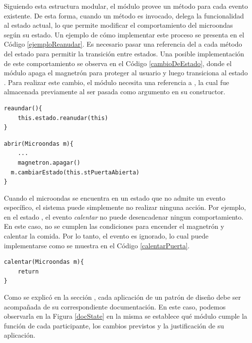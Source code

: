 Siguiendo esta estructura modular, el módulo \Microondas provee un método para cada evento existente. De esta forma, cuando un método es invocado, delega la funcionalidad al estado actual, lo que permite modificar el comportamiento del microondas según su estado. Un ejemplo de cómo implementar este proceso se presenta en el Código \ref{ejemploReanudar}. Es necesario pasar una referencia del \Microondas a cada método del estado para permitir la transición entre estados. Una posible implementación de este comportamiento se observa en el Código \ref{cambioDeEstado}, donde el módulo \Calentando apaga el magnetrón para proteger al usuario y luego transiciona al estado \PuertaAbierta. Para realizar este cambio, el módulo \Calentando necesita una referencia a \PuertaAbierta, la cual fue almacenada previamente al ser pasada como argumento en su constructor.

\begin{lstlisting}[caption=Ejemplo de implementación método reaundar del módulo Microondas, label=ejemploReanudar]
reaundar(){
    this.estado.reanudar(this)
}
\end{lstlisting}
\begin{lstlisting}[caption=Ejemplo de implementación método abrir del módulo Calentando, label=cambioDeEstado]
abrir(Microondas m){
	...
	magnetron.apagar()
  m.cambiarEstado(this.stPuertaAbierta)
}
\end{lstlisting}

Cuando el microondas se encuentra en un estado que no admite un evento específico, el sistema puede simplemente no realizar ninguna acción. Por ejemplo, en el estado \PuertaAbierta, el evento \textit{calentar} no puede desencadenar ningun comportamiento. En este caso, no se cumplen las condiciones para encender el magnetrón y calentar la comida. Por lo tanto, el evento es ignorado, lo cual puede implementarse como se muestra en el Código \ref{calentarPuerta}.
\begin{lstlisting}[caption=Ejemplo de implementación método calentar del módulo PuertaAbierta, label=calentarPuerta]
calentar(Microondas m){
	return
}
\end{lstlisting}

Como se explicó en la sección , cada aplicación de un patrón de diseño debe ser acompañada de su correspondiente documentación. En este caso, podemos observarla en la Figura \ref{docState} en la misma se establece qué módulo cumple la función de cada participante, los cambios previstos y la justificación de su aplicación.

